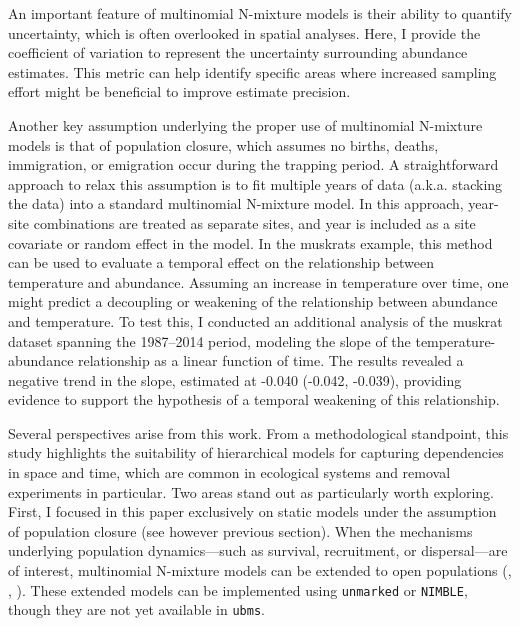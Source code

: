 \documentclass[
  11pt,
  a4paper,
]{article}
\begin{document}
An important feature of multinomial N-mixture models is their ability to quantify uncertainty, which is often overlooked in spatial analyses. Here, I provide the coefficient of variation to represent the uncertainty surrounding abundance estimates. This metric can help identify specific areas where increased sampling effort might be beneficial to improve estimate precision.

Another key assumption underlying the proper use of multinomial N-mixture models is that of population closure, which assumes no births, deaths, immigration, or emigration occur during the trapping period. A straightforward approach to relax this assumption is to fit multiple years of data (a.k.a. stacking the data) into a standard multinomial N-mixture model. In this approach, year-site combinations are treated as separate sites, and year is included as a site covariate or random effect in the model. In the muskrats example, this method can be used to evaluate a temporal effect on the relationship between temperature and abundance. Assuming an increase in temperature over time, one might predict a decoupling or weakening of the relationship between abundance and temperature. To test this, I conducted an additional analysis of the muskrat dataset spanning the 1987--2014 period, modeling the slope of the temperature-abundance relationship as a linear function of time. The results revealed a negative trend in the slope, estimated at -0.040 (-0.042, -0.039), providing evidence to support the hypothesis of a temporal weakening of this relationship.

Several perspectives arise from this work. From a methodological standpoint, this study highlights the suitability of hierarchical models for capturing dependencies in space and time, which are common in ecological systems and removal experiments in particular. Two areas stand out as particularly worth exploring. First, I focused in this paper exclusively on static models under the assumption of population closure (see however previous section). When the mechanisms underlying population dynamics---such as survival, recruitment, or dispersal---are of interest, multinomial N-mixture models can be extended to open populations (, , ). These extended models can be implemented using \texttt{unmarked} or \texttt{NIMBLE}, though they are not yet available in \texttt{ubms}.
\end{document}
